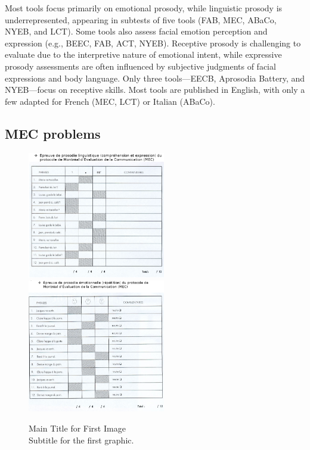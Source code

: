 Most tools focus primarily on emotional prosody, while linguistic prosody is underrepresented, appearing in subtests of five tools (FAB, MEC, ABaCo, NYEB, and LCT). Some tools also assess facial emotion perception and expression (e.g., BEEC, FAB, ACT, NYEB). Receptive prosody is challenging to evaluate due to the interpretive nature of emotional intent, while expressive prosody assessments are often influenced by subjective judgments of facial expressions and body language. Only three tools—EECB, Aprosodia Battery, and NYEB—focus on receptive skills.
Most tools are published in English, with only a few adapted for French (MEC, LCT) or Italian (ABaCo). \cite{benedetti_assessment_2022}

\subsection {MEC problems} 
\begin{figure}[ht!]
    \centering
    \includegraphics[width=6cm]{MainLayout/Images/chapter2/mec_c.png}
    \includegraphics[width=6cm]{MainLayout/Images/chapter2/mec_r.png}
    \caption{Main Title for First Image \\ \small Subtitle for the first graphic.}
    \label{fig:mec_c}
\end{figure}  


